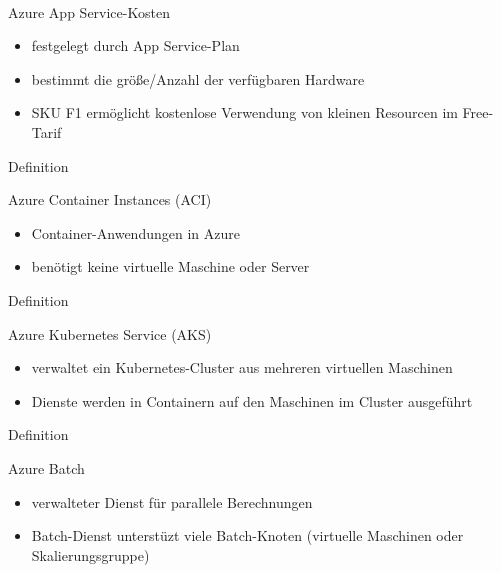 \documentclass{scrartcl}
\newenvironment{flashcard}[2][]{%
    #1
    \vfill
    \centerline{\Large{#2}}
    \vfill
\newpage
}
{\newpage}
\begin{document}
    \begin{flashcard}[\ ]{Azure App Service-Kosten}
        \begin{itemize}
            \item festgelegt durch App Service-Plan
            \item bestimmt die größe/Anzahl der verfügbaren Hardware
            \item SKU F1 ermöglicht kostenlose Verwendung von kleinen Resourcen im Free-Tarif
        \end{itemize}

    \end{flashcard}

    \begin{flashcard}[Definition]{Azure Container Instances (ACI)}
        \begin{itemize}
            \item Container-Anwendungen in Azure
            \item benötigt keine virtuelle Maschine oder Server
        \end{itemize}

    \end{flashcard}

    \begin{flashcard}[Definition]{Azure Kubernetes Service (AKS)}
        \begin{itemize}
            \item verwaltet ein Kubernetes-Cluster aus mehreren virtuellen Maschinen
            \item Dienste werden in Containern auf den Maschinen im Cluster ausgeführt
        \end{itemize}

    \end{flashcard}

    \begin{flashcard}[Definition]{Azure Batch}
        \begin{itemize}
            \item verwalteter Dienst für parallele Berechnungen
            \item Batch-Dienst unterstüzt viele Batch-Knoten (virtuelle Maschinen oder Skalierungsgruppe)
        \end{itemize}
    \end{flashcard}
\end{document}
